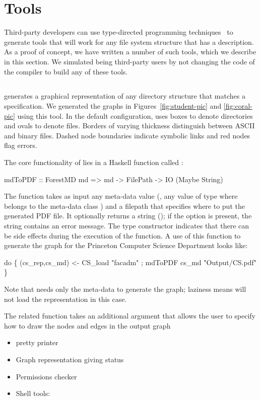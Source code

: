 \section{Tools}
\label{sec:tools}
Third-party developers can use type-directed programming techniques~\cite{??} to
generate tools that will work for any file system structure that has a
\forest{} description.  As a proof of concept, we have written a
number of such tools, which we describe in this section.  We simulated
being third-party users by not changing the code of the \forest{}
compiler to build any of these tools.

\subsection{\fg{}}
\fg{} generates a graphical representation of any directory structure that matches a 
\forest{} specification.  We generated the graphs in
Figures~\ref{fig:student-pic} and \ref{fig:coral-pic} using  
this tool.  In the default configuration, \fg{} uses boxes to denote
directories and ovals to denote files. Borders of varying
thickness distinguish between ASCII and binary files.  
Dashed node boundaries indicate symbolic links and red nodes flag errors.

The core functionality of \fg{} lies in a Haskell function
called :
\begin{code}
mdToPDF :: ForestMD md => 
     md -> FilePath -> IO (Maybe String)
\end{code}
The function takes as input any \forest{} meta-data value (\ie{}, any
value of type  where  belongs to the \forest{}
meta-data class ) and a filepath that specifies where to
put the generated PDF file.  It optionally returns a string (); if the option is present, the string contains an error
message.  The  type constructor indicates that there can be
side effects during the execution of the function.  A use of
this function to generate the graph for the Princeton Computer Science
Department looks like:
\begin{code}
 do \{ (cs_rep,cs_md) <- CS_load  "facadm"
    ; mdToPDF cs_md "Output/CS.pdf" 
    \}
\end{code}
Note that \fg{} needs only the meta-data to generate the graph;
laziness means \forest{} will not load the representation in this
case. 

The related function  takes an additional
argument that allows the user to specify how to draw the nodes and
edges in the output graph





\begin{itemize}
\item pretty printer
\item Graph representation giving status
\item Permissions checker
\item Shell tools: 
\end{itemize}
